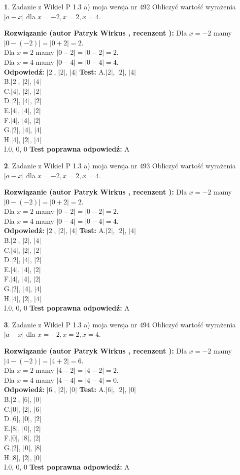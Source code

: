 \documentclass[12pt, a4paper]{article}
\theoremstyle{definition} %
\newtheorem{zad}{}
\newcommand{\zadStart}[1]{\begin{zad}#1\newline}
\newcommand{\zadStop}{\end{zad}}
\newcommand{\rozwStart}[2]{\noindent \textbf{Rozwiązanie (autor #1 , recenzent #2): }\newline}
\newcommand{\rozwStop}{\newline}
\newcommand{\odpStart}{\noindent \textbf{Odpowiedź:}\newline}
\newcommand{\odpStop}{\newline}
\newcommand{\testStart}{\noindent \textbf{Test:}\newline}
\newcommand{\testStop}{\newline}
\newcommand{\kluczStart}{\noindent \textbf{Test poprawna odpowiedź:}\newline}
\newcommand{\kluczStop}{\newline}
\begin{document}
\zadStart{Zadanie z Wikieł P 1.3 a) moja wersja nr 492}
Obliczyć wartość wyrażenia $|a - x|$ dla $x=-2,x=2,x=4$.
\zadStop
\rozwStart{Patryk Wirkus}{}
Dla $x = -2$ mamy $|0 - (-2)| = |0 + 2| = 2$.\\
Dla $x = 2$ mamy $|0 - 2| = |0 - 2| = 2$.\\
Dla $x = 4$ mamy $|0 - 4| = |0 - 4| = 4$.\\
\rozwStop
\odpStart
$|2|$, $|2|$, $|4|$
\odpStop
\testStart
A.$|2|$, $|2|$, $|4|$\\
B.$|2|$, $|2|$, $|4|$\\
C.$|4|$, $|2|$, $|2|$\\
D.$|2|$, $|4|$, $|2|$\\
E.$|4|$, $|4|$, $|2|$\\
F.$|4|$, $|4|$, $|2|$\\
G.$|2|$, $|4|$, $|4|$\\
H.$|4|$, $|2|$, $|4|$\\
I.$0$, $0$, $0$
\testStop
\kluczStart
A
\kluczStop



\zadStart{Zadanie z Wikieł P 1.3 a) moja wersja nr 493}
Obliczyć wartość wyrażenia $|a - x|$ dla $x=-2,x=2,x=4$.
\zadStop
\rozwStart{Patryk Wirkus}{}
Dla $x = -2$ mamy $|0 - (-2)| = |0 + 2| = 2$.\\
Dla $x = 2$ mamy $|0 - 2| = |0 - 2| = 2$.\\
Dla $x = 4$ mamy $|0 - 4| = |0 - 4| = 4$.\\
\rozwStop
\odpStart
$|2|$, $|2|$, $|4|$
\odpStop
\testStart
A.$|2|$, $|2|$, $|4|$\\
B.$|2|$, $|2|$, $|4|$\\
C.$|4|$, $|2|$, $|2|$\\
D.$|2|$, $|4|$, $|2|$\\
E.$|4|$, $|4|$, $|2|$\\
F.$|4|$, $|4|$, $|2|$\\
G.$|2|$, $|4|$, $|4|$\\
H.$|4|$, $|2|$, $|4|$\\
I.$0$, $0$, $0$
\testStop
\kluczStart
A
\kluczStop



\zadStart{Zadanie z Wikieł P 1.3 a) moja wersja nr 494}
Obliczyć wartość wyrażenia $|a - x|$ dla $x=-2,x=2,x=4$.
\zadStop
\rozwStart{Patryk Wirkus}{}
Dla $x = -2$ mamy $|4 - (-2)| = |4 + 2| = 6$.\\
Dla $x = 2$ mamy $|4 - 2| = |4 - 2| = 2$.\\
Dla $x = 4$ mamy $|4 - 4| = |4 - 4| = 0$.\\
\rozwStop
\odpStart
$|6|$, $|2|$, $|0|$
\odpStop
\testStart
A.$|6|$, $|2|$, $|0|$\\
B.$|2|$, $|6|$, $|0|$\\
C.$|0|$, $|2|$, $|6|$\\
D.$|6|$, $|0|$, $|2|$\\
E.$|8|$, $|0|$, $|2|$\\
F.$|0|$, $|8|$, $|2|$\\
G.$|2|$, $|0|$, $|8|$\\
H.$|8|$, $|2|$, $|0|$\\
I.$0$, $0$, $0$
\testStop
\kluczStart
A
\kluczStop
\end{document}
